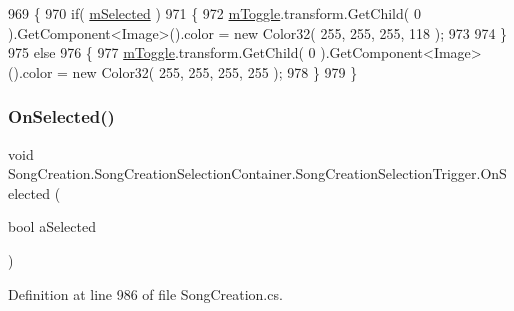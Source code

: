 \begin{DoxyCode}
969             \{
970                 \textcolor{keywordflow}{if}( \hyperlink{class_song_creation_1_1_song_creation_selection_container_1_1_song_creation_selection_trigger_a49ffd4516ec7982b1683a44b4f22de74}{mSelected} )
971                 \{
972                     \hyperlink{class_song_creation_1_1_song_creation_selection_container_1_1_song_creation_selection_trigger_affc6248c907c4357b0a0a30b86635f3a}{mToggle}.transform.GetChild( 0 ).GetComponent<Image>().color = \textcolor{keyword}{new} Color32( 255, 
      255, 255, 118 );
973 
974                 \}
975                 \textcolor{keywordflow}{else}
976                 \{
977                     \hyperlink{class_song_creation_1_1_song_creation_selection_container_1_1_song_creation_selection_trigger_affc6248c907c4357b0a0a30b86635f3a}{mToggle}.transform.GetChild( 0 ).GetComponent<Image>().color = \textcolor{keyword}{new} Color32( 255, 
      255, 255, 255 );
978                 \}
979             \}
\end{DoxyCode}
\mbox{\label{class_song_creation_1_1_song_creation_selection_container_1_1_song_creation_selection_trigger_a33e6eb8e123cb32f40c2c06149a31087}} 
\subsubsection{\texorpdfstring{On\+Selected()}{OnSelected()}}
{\footnotesize\ttfamily void Song\+Creation.\+Song\+Creation\+Selection\+Container.\+Song\+Creation\+Selection\+Trigger.\+On\+Selected (\begin{DoxyParamCaption}\item[{bool}]{a\+Selected }\end{DoxyParamCaption})}



Definition at line 986 of file Song\+Creation.\+cs.



